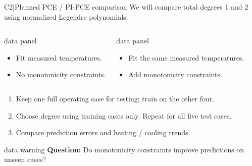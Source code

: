 \renewcommand{\backupcode}{C2}

\begin{frame}[more-space,label=backup-C2]{C2\enspace|\enspace Planned PCE / PI-PCE comparison}
  \small We will compare total degrees 1 and 2 using normalized Legendre polynomials.
  \par\medskip
  \begin{columns}[T,onlytextwidth]
      \begin{beamercolorbox}[sep=2.5mm,wd=\linewidth]{data panel}
        \small
        \begin{itemize}
          \item Fit measured temperatures.
          \item No monotonicity constraints.
        \end{itemize}
      \end{beamercolorbox}
      \begin{beamercolorbox}[sep=2.5mm,wd=\linewidth]{data panel}
        \small
        \begin{itemize}
          \item Fit the same measured temperatures.
          \item Add monotonicity constraints.
        \end{itemize}
      \end{beamercolorbox}
  \end{columns}
  \medskip
  \small
  \begin{enumerate}
    \item Keep one full operating case for testing; train on the other four.
    \item Choose degree using training cases only. Repeat for all five test cases.
    \item Compare prediction errors and heating / cooling trends.
  \end{enumerate}
  \smallskip
  \begin{beamercolorbox}[sep=2mm,wd=\textwidth]{data warning}
    \small \textbf{Question:} Do monotonicity constraints improve predictions on unseen cases?
  \end{beamercolorbox}
\end{frame}

\renewcommand{\backupcode}{C3}

